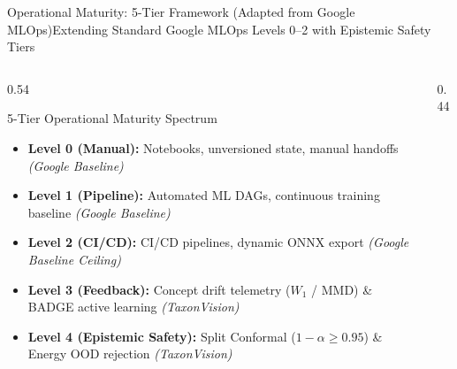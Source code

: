 \begin{frame}{Operational Maturity: 5-Tier Framework (Adapted from Google MLOps)}{Extending Standard Google MLOps Levels 0--2 with Epistemic Safety Tiers}
    \begin{columns}[c]
        \begin{column}{0.54\textwidth}
            \begin{block}{5-Tier Operational Maturity Spectrum}
                \begin{itemize}\scriptsize
                    \setlength{\itemsep}{2.5pt}
                    \item \textbf{Level 0 (Manual):} Notebooks, unversioned state, manual handoffs \textcolor{black!60}{\textit{(Google Baseline)}}
                    \item \textbf{Level 1 (Pipeline):} Automated ML DAGs, continuous training baseline \textcolor{black!60}{\textit{(Google Baseline)}}
                    \item \textbf{Level 2 (CI/CD):} CI/CD pipelines, dynamic ONNX export \textcolor{black!60}{\textit{(Google Baseline Ceiling)}}
                    \item \textbf{Level 3 (Feedback):} Concept drift telemetry ($W_1$ / MMD) \& BADGE active learning \textcolor{deepblue}{\textit{(TaxonVision)}}
                    \item \textbf{Level 4 (Epistemic Safety):} Split Conformal ($1 - \alpha \ge 0.95$) \& Energy OOD rejection \textcolor{plantgreen}{\textit{(TaxonVision)}}
                \end{itemize}
            \end{block}
            \vspace{0.15cm}
            \statuspartial
        \end{column}
        \begin{column}{0.44\textwidth}
            \centering
\end{column}
\end{columns}
\end{frame}
